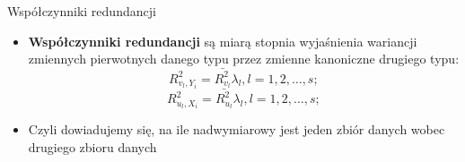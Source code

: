 \documentclass{beamer}
\begin{document}
\begin{frame}{Współczynniki redundancji}
  \begin{itemize}
  \item \textbf{Współczynniki redundancji} są miarą stopnia wyjaśnienia wariancji zmiennych pierwotnych danego typu przez zmienne kanoniczne drugiego typu:
    $$R^2_{v_l,Y_i} = \bar{R^2_{v_l}}\lambda_l, l = 1, 2, \dots, s;$$
    $$R^2_{u_l,X_i} = \bar{R^2_{u_l}}\lambda_l, l = 1, 2, \dots, s;$$
  \item Czyli dowiadujemy się, na ile nadwymiarowy jest jeden zbiór danych wobec drugiego zbioru danych
  \end{itemize}
\end{frame}
\end{document}
